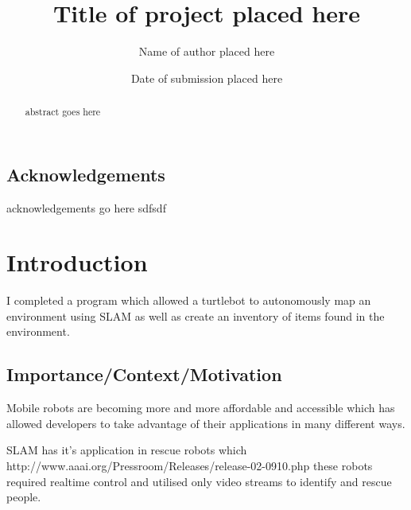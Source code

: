 \documentclass{mproj}
\begin{document}
\title{Title of project placed here}
\author{Name of author placed here}
\date{Date of submission placed here}
\maketitle

\begin{abstract}
abstract goes here
\end{abstract}

\educationalconsent


\newpage
\section*{Acknowledgements}

acknowledgements go here sdfsdf

\tableofcontents

\chapter{Introduction}\label{intro}


I completed a program which allowed a turtlebot to autonomously map an environment using SLAM as well as create an inventory of items found in the environment.


\section{Importance/Context/Motivation}

Mobile robots are becoming more and more affordable and accessible which has allowed developers to take advantage of their applications in many different ways. 

SLAM has it's application in rescue robots which
http://www.aaai.org/Pressroom/Releases/release-02-0910.php
these robots required realtime control and utilised only video streams to identify and rescue people.
\end{document}
